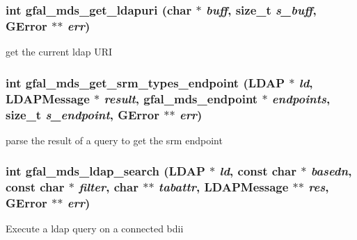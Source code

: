 \subsubsection{\setlength{\rightskip}{0pt plus 5cm}int gfal\_\-mds\_\-get\_\-ldapuri (char $\ast$ {\em buff}, size\_\-t {\em s\_\-buff}, GError $\ast$$\ast$ {\em err})}\label{gfal__common__mds__ldap__internal_8c_b93065c14371b4ed95d7b5ba6557f237}


get the current ldap URI 
\subsubsection{\setlength{\rightskip}{0pt plus 5cm}int gfal\_\-mds\_\-get\_\-srm\_\-types\_\-endpoint (LDAP $\ast$ {\em ld}, LDAPMessage $\ast$ {\em result}, gfal\_\-mds\_\-endpoint $\ast$ {\em endpoints}, size\_\-t {\em s\_\-endpoint}, GError $\ast$$\ast$ {\em err})}\label{gfal__common__mds__ldap__internal_8c_058a2581cea3066c602941b334b8ec06}


parse the result of a query to get the srm endpoint 
\subsubsection{\setlength{\rightskip}{0pt plus 5cm}int gfal\_\-mds\_\-ldap\_\-search (LDAP $\ast$ {\em ld}, const char $\ast$ {\em basedn}, const char $\ast$ {\em filter}, char $\ast$$\ast$ {\em tabattr}, LDAPMessage $\ast$$\ast$ {\em res}, GError $\ast$$\ast$ {\em err})}\label{gfal__common__mds__ldap__internal_8c_cddb3a7427f2316670b0d71ff94dd6ee}


Execute a ldap query on a connected bdii 